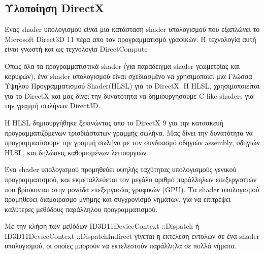 \subsection{Υλοποίηση DirectX}
Ένας shader υπολογισμού είναι μια κατάσταση shader υπολογισμού που εξαπλώνει το Microsoft Direct3D 11 πέρα απο τον προγραμματισμό γραφικών. Η τεχνολογία αυτή είναι γνωστή και ως τεχνολογία DirectCompute\cite{computeshaders-2}

Όπως όλα τα προγραμματιστικά shader (για παράδειγμα shader γεωμετρίας και κορυφών), ένα shader υπολογισμού είναι σχεδιασμένο να χρησιμοποιεί μια Γλώσσα Υψηλού Προγραμματισμού Shader(HLSL) για το DirectX. Η HLSL, χρησιμοποιείται για το DirectX και μας δίνει την δυνατότητα να δημιουργήσουμε C like shaders για την γραμμή σωλήνων Direct3D. 

Η HLSL δημιουργήθηκε ξεκινώντας απο το DirectX 9 για την κατασκευή προγραμματιζόμενων τρισδιάστατων γραμμής σωλήνα. Μας δίνει την δυνατότητα να προγραμματίσουμε την γραμμή σωλήνα με τον συνδυασμό οδηγιών assembly, οδηγιών HLSL, και δηλώσεις καθορισμένων λειτουργιών.

Ένα shader υπολογισμού προμηθεύει υψηλής ταχύτητας υπολογισμούς γενικού προγραμματισμού, και εκμεταλλεύεται τον μεγάλο αριθμό παράλληλων επεξεργαστών που βρίσκονται στην μονάδα επεξεργασίας γραφικών (GPU). Τα shader υπολογισμού προμηθεύει διαμοιρασμό μνήμης και συγχρονισμό νημάτων, για να επιτρέψει καλύτερες μεθόδους παράλληλου προγραμματισμού. 

Με την κλήση των μεθόδων ID3D11DeviceContext ::Dispatch ή ID3D11DeviceContext ::DispatchIndirect γίνεται η εκτέλεση εντολών σε ένα shader υπολογισμού, οι οποίες μπορούν να εκτελεστούν παράλληλα σε πολλά νήματα.